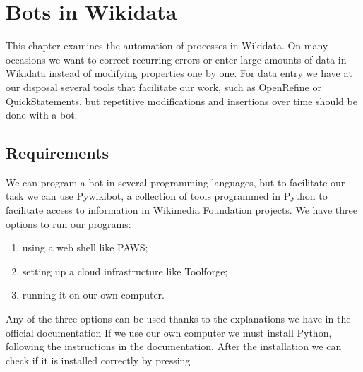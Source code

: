 \chapter{Bots in Wikidata}
\label{ch:bots eng}

This chapter examines the automation of processes in Wikidata. On many occasions we want to correct recurring errors or enter large amounts of data in Wikidata instead of modifying properties one by one. 
For data entry we have at our disposal several tools that facilitate our work, such as OpenRefine %
 or QuickStatements, but repetitive modifications and insertions over time should be done with a bot.


\section{Requirements}

\label{sec:requirements eng}
We can program a bot in several programming languages, but to facilitate our task we can use Pywikibot, a collection of tools programmed in Python to facilitate access to information in Wikimedia Foundation projects. We have three options to run our programs:
\begin{enumerate}
  \item using a web shell like PAWS; 
  \item setting up a cloud infrastructure like Toolforge;
  \item running it on our own computer.
\end{enumerate}

Any of the three options can be used thanks to the explanations we have in the official documentation 
If we use our own computer we must install Python, following the instructions in the documentation.
After the installation we can check
if it is installed correctly
by pressing

